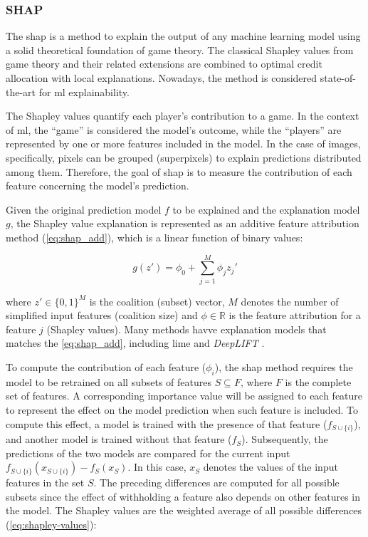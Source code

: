 \subsubsection{SHAP}

The \acf{shap} is a method to explain the output of any machine learning model using a solid theoretical foundation of game theory. The classical Shapley values \citep{shapley1953value} from game theory and their related extensions are combined to optimal credit allocation with local explanations. Nowadays, the method is considered state-of-the-art for \acs{ml} explainability.

The Shapley values quantify each player's contribution to a game. In the context of \acl{ml}, the ``game'' is considered the model's outcome, while the ``players'' are represented by one or more features included in the model. In the case of images, specifically, pixels can be grouped (superpixels) to explain predictions distributed among them. Therefore, the goal of \acs{shap} is to measure the contribution of each feature concerning the model's prediction.

Given the original prediction model $f$ to be explained and the explanation model $g$, the Shapley value explanation is represented as an additive feature attribution method (\autoref{eq:shap_add}), which is a linear function of binary values:

\begin{equation}
\label{eq:shap_add}
g(z')=\phi_0+\sum_{j=1}^M\phi_jz_j'
\end{equation}

\noindent
where $z' \in \{0,1\}^M$ is the coalition (subset) vector, $M$ denotes the number of simplified input features (coalition size) and $\phi \in \mathbb{R}$ is the feature attribution for a feature $j$ (Shapley values). Many methods havve explanation models that matches the \autoref{eq:shap_add}, including \acs{lime} \citep{lime} and \textit{DeepLIFT} \citep{deeplift_old, deeplift_new}.

To compute the contribution of each feature ($\phi_i$), the \acs{shap} method requires the model to be retrained on all subsets of features $S \subseteq F$, where $F$ is the complete set of features. A corresponding importance value will be assigned to each feature to represent the effect on the model prediction when such feature is included. To compute this effect, a model is trained with the presence of that feature ($f_{S \cup \{i\}}$), and another model is trained without that feature ($f_S$). Subsequently, the predictions of the two models are compared for the current input $f_{S \cup \{i\}}(x_{S \cup \{i\}}) - f_S(x_S)$. In this case, $x_S$ denotes the values of the input features in the set $S$. The preceding differences are computed for all possible subsets since the effect of withholding a feature also depends on other features in the model. The Shapley values are the weighted average of all possible differences (\autoref{eq:shapley-values}):

